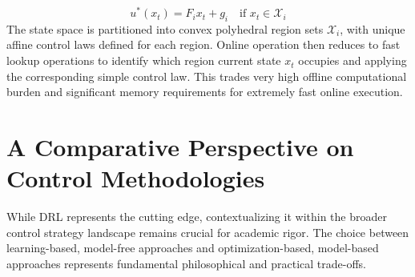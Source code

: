 \begin{equation}
u^*(x_t) = F_i x_t + g_i \quad \text{if } x_t \in \mathcal{X}_i
\end{equation}
\noindent
The state space is partitioned into convex polyhedral region sets $\mathcal{X}_i$, with unique affine control laws defined for each region. Online operation then reduces to fast lookup operations to identify which region current state $x_t$ occupies and applying the corresponding simple control law. This trades very high offline computational burden and significant memory requirements for extremely fast online execution.

\cite{bemporad2013explicit} \cite{borrelli2017predictive}



\section{A Comparative Perspective on Control Methodologies}

While DRL represents the cutting edge, contextualizing it within the broader control strategy landscape remains crucial for academic rigor. The choice between learning-based, model-free approaches and optimization-based, model-based approaches represents fundamental philosophical and practical trade-offs.

